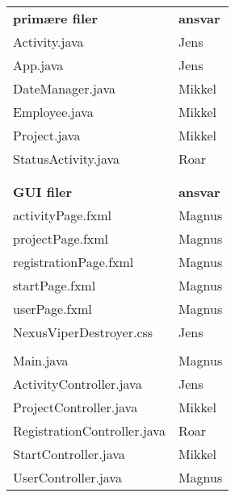 \begin{multicols}{2}

\begin{table}[H]
\begin{tabular}{ll}
\textbf{primære filer}  & \textbf{ansvar} \\
Activity.java               & Jens \\
App.java                    & Jens \\
DateManager.java            & Mikkel \\
Employee.java               & Mikkel \\
Project.java                & Mikkel \\
StatusActivity.java         & Roar \\
\\
\\
\textbf{GUI filer}  & \textbf{ansvar} \\
activityPage.fxml               & Magnus \\
projectPage.fxml                & Magnus \\
registrationPage.fxml           & Magnus \\
startPage.fxml                  & Magnus \\
userPage.fxml                   & Magnus \\
NexusViperDestroyer.css         & Jens \\
\\
Main.java                       & Magnus \\
ActivityController.java         & Jens \\
ProjectController.java          & Mikkel \\
RegistrationController.java     & Roar \\
StartController.java            & Mikkel \\
UserController.java             & Magnus \\
\end{tabular}
\end{table}


\end{multicols}
